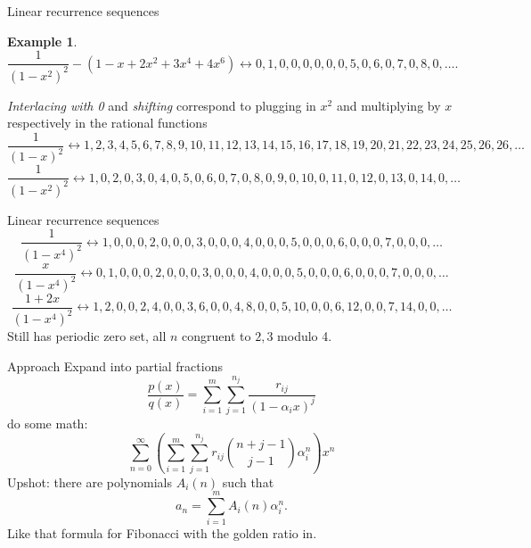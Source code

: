 \documentclass[notheorems]{beamer}
\theoremstyle{plain}
\theoremstyle{definition}
\theoremstyle{definition}
\theoremstyle{definition}
\newtheorem{example}[theorem]{Example}
\begin{document}
\begin{frame}{Linear recurrence sequences}
\begin{example}
\begin{equation*}
\frac{1}{(1-x^2)^2} - (1 - x + 2x^2 + 3x^4 + 4x^6)
\leftrightarrow 0,1,0,0,0,0,0,0,5,0,6,0,7,0,8,0,\ldots\text{.}
\end{equation*}
\pause
\end{example}
\emph{Interlacing with 0} and \emph{shifting} correspond to plugging in \(x^2\) and multiplying by \(x\) respectively in the rational functions
\pause
\begin{equation*}
	\frac{1}{(1-x)^2} \leftrightarrow 1,2,3,4,5,6,7,8,9,10,11,12,13,14,15,16,17,18,19,20,21,22,23,24,25,26,26,\ldots
\end{equation*}
\pause
%
\begin{equation*}
	\frac{1}{(1-x^2)^2} \leftrightarrow 1,0,2,0,3,0,4,0,5,0,6,0,7,0,8,0,9,0,10,0,11,0,12,0,13,0,14,0,\ldots
\end{equation*}
\end{frame}

\begin{frame}{Linear recurrence sequences}
\begin{equation*}
\frac{1}{(1-x^4)^2} \leftrightarrow 1,0,0,0,2,0,0,0,3,0,0,0,4,0,0,0,5,0,0,0,6,0,0,0,7,0,0,0,\ldots
\end{equation*}
\pause
%
\begin{equation*}
\frac{x}{(1-x^4)^2} \leftrightarrow 0,1,0,0,0,2,0,0,0,3,0,0,0,4,0,0,0,5,0,0,0,6,0,0,0,7,0,0,0,\ldots
\end{equation*}
\pause
%
\begin{equation*}
\frac{1+2x}{(1-x^4)^2} \leftrightarrow 1,2,0,0,2,4,0,0,3,6,0,0,4,8,0,0,5,10,0,0,6,12,0,0,7,14,0,0,\ldots
\end{equation*}
\pause
Still has periodic zero set, all \(n\) congruent to \(2,3\) modulo 4.%
\par
\end{frame}

\begin{frame}{Approach}
Expand into partial fractions%
\begin{equation*}
\frac{p(x)}{q(x)} = \sum_{i = 1}^m \sum_{j=1}^{n_j} \frac{r_{ij}}{(1-\alpha_i x)^j}
\end{equation*}
\pause
do some math:
\begin{equation*}
\sum_{n=0}^\infty \left(\sum_{i = 1}^m \sum_{j=1}^{n_j} r_{ij} \binom{n+j-1}{j-1}  \alpha_i^n\right) x^n
\end{equation*}
\pause
Upshot: there are polynomials \(A_i(n)\) such that%
\begin{equation*}
a_n = \sum_{i=1}^m A_i(n)\alpha_i^n\text{.}
\end{equation*}
Like that formula for Fibonacci with the golden ratio in.
\end{frame}
\end{document}
